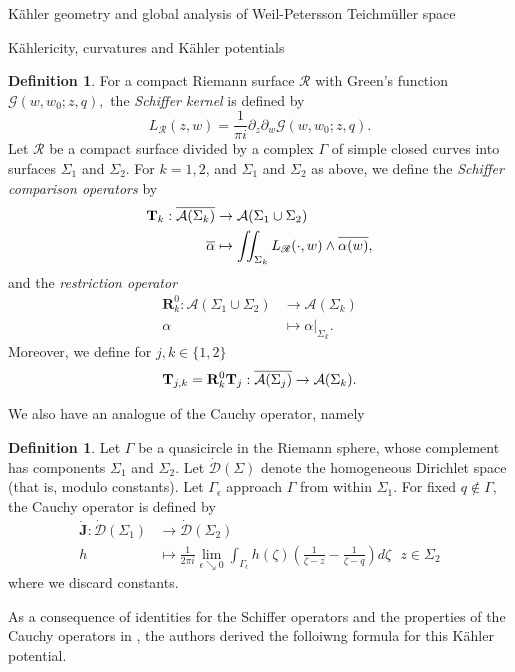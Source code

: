 \documentclass[12pt]{amsart}
\newcommand{\riem}{\Sigma}  %
\theoremstyle{plain}
\theoremstyle{definition}
\newtheorem{definition}[theorem]{Definition}
\theoremstyle{remark}
\numberwithin{equation}{section} %
\numberwithin{figure}{section} %
\begin{document}
\begin{section}{K\"ahler geometry and global analysis of Weil-Petersson Teichm\"uller space}
\begin{subsection}{K\"ahlericity, curvatures and K\"ahler potentials}
\begin{definition}
For a compact Riemann surface $\mathscr{R}$ with Green's function $\mathscr{G}(w,w_0;z,q),$ the \emph{Schiffer kernel} is defined by
 \[  L_{\mathscr{R}}(z,w) =  \frac{1}{\pi i} \partial_z \partial_w \mathscr{G}(w,w_0;z,q).    \]
Let $\mathscr{R}$ be a compact surface divided by a complex $\Gamma$ of simple closed curves into surfaces $\riem_1$ and $\riem_2$. For $k=1,2$, and $\riem_1$ and $\riem_2$ as above, we define the {\it Schiffer comparison operators} by
 \begin{align*}
  {\bf{T}}_{k}: \overline{\mathcal{A}(\riem_k)} & \rightarrow \mathcal{A}(\riem_1 \cup \riem_2)  \\
  \overline{\alpha} & \mapsto \iint_{\riem_k} L_{\mathscr{R}}(\cdot,w) \wedge \overline{\alpha(w)},
 \end{align*}
 and the {\it restriction operator}
\begin{align*}
  \mathbf{R}^0_{k}: \mathcal{A}(\riem_1 \cup \riem_2) & \rightarrow \mathcal{A}(\riem_k) \\
    \alpha & \mapsto \left. \alpha \right|_{\riem_k}.
 \end{align*}
Moreover, we define for $j,k \in \{1,2\}$
 \begin{equation}\label{defn: T sigmajsigmak}
     {\bf{T}}_{j,k} = \mathbf{R}^0_{k} \mathbf{T}_{j}: \overline{\mathcal{A}(\riem_j)} \rightarrow \mathcal{A}(\riem_k).
     \end{equation}
 \end{definition}
We also have an analogue of the Cauchy operator, namely
 \begin{definition}
     Let $\Gamma$ be a quasicircle in the Riemann sphere, whose complement has components $\riem_1$ and $\riem_2$. 
Let $\dot{\mathcal{D}}(\riem)$ denote the homogeneous Dirichlet space (that is, modulo constants). Let $\Gamma_\epsilon$ approach $\Gamma$ from within $\riem_1$.  For fixed $q \notin \Gamma$, the Cauchy operator is defined by 
\begin{align*}
 \dot{\mathbf{J}}:\dot{\mathcal{D}}(\riem_1) & \rightarrow \dot{\mathcal{D}}(\riem_2)  \\
 h & \mapsto \frac{1}{2\pi i} \lim_{\epsilon \searrow 0} \int_{\Gamma_\epsilon}  {h(\zeta)} \left( \frac{1}{\zeta-z} - \frac{1}{\zeta-q} \right) d\zeta \ \ \ z \in \riem_2  
\end{align*}
where we discard constants.
\end{definition}

 
 As a consequence of identities for the Schiffer operators and the properties of the Cauchy operators in \cite{Schippers_Staubach_scattering}, the authors derived the folloiwng formula for this K\"ahler potential.\\ 


\end{subsection}
\end{section}
\end{document}
